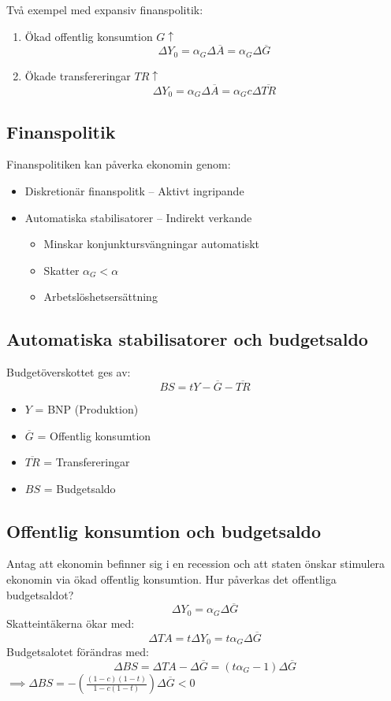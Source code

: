 \documentclass[12pt,a4paper]{article}
\begin{document}
\noindent Två exempel med expansiv finanspolitik:
\begin{enumerate}
    \item Ökad offentlig konsumtion $G\uparrow$
$$\Delta Y_0 = \alpha_G \Delta \overline{A} = \alpha_G \Delta \overline{G}$$
    \item Ökade transfereringar $TR\uparrow$
$$\Delta Y_0 = \alpha_G \Delta \overline{A} = \alpha_G c \Delta \overline{TR}$$
\end{enumerate}

\subsection{Finanspolitik}
Finanspolitiken kan påverka ekonomin genom:
\begin{itemize}
    \item Diskretionär finanspolitk -- Aktivt ingripande
    \item Automatiska stabilisatorer -- Indirekt verkande
    \begin{itemize}
        \item Minskar konjunktursvängningar automatiskt
        \item Skatter $\alpha_G < \alpha$
        \item Arbetslöshetsersättning
    \end{itemize}
\end{itemize}

\subsection{Automatiska stabilisatorer och budgetsaldo}
Budgetöverskottet ges av:
$$BS = tY - \overline{G} - \overline{TR}$$
\begin{itemize}
    \item $Y$ = BNP (Produktion)
    \item $\overline{G}$ = Offentlig konsumtion
    \item $\overline{TR}$ = Transfereringar
    \item $BS$ = Budgetsaldo
\end{itemize}

\subsection{Offentlig konsumtion och budgetsaldo}
Antag att ekonomin befinner sig i en recession och att staten önskar stimulera ekonomin via ökad offentlig konsumtion. Hur påverkas det offentliga budgetsaldot?
$$\Delta Y_0 = \alpha_G \Delta \overline{G}$$
\noindent Skatteintäkerna ökar med:
$$\Delta TA = t \Delta Y_0 = t \alpha_G \Delta \overline{G}$$
\noindent Budgetsalotet förändras med:
$$\Delta BS = \Delta TA - \Delta \overline{G} = (t \alpha_G - 1) \Delta \overline{G}$$
$\implies \Delta BS = -(\frac{(1-c)(1-t)}{1-c(1-t)})\Delta \overline{G} < 0$
\end{document}
